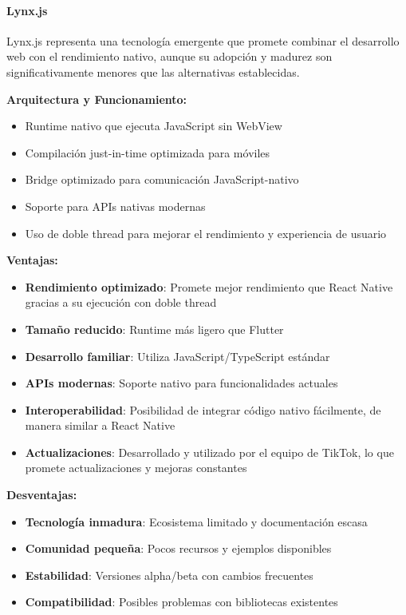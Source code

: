 \paragraph{Lynx.js}

Lynx.js representa una tecnología emergente que promete combinar el desarrollo web con el rendimiento nativo, aunque su adopción y madurez son significativamente menores que las alternativas establecidas.

\textbf{Arquitectura y Funcionamiento:}
\begin{itemize}
    \item Runtime nativo que ejecuta JavaScript sin WebView
    \item Compilación just-in-time optimizada para móviles
    \item Bridge optimizado para comunicación JavaScript-nativo
    \item Soporte para APIs nativas modernas
    \item Uso de doble thread para mejorar el rendimiento y experiencia de usuario
\end{itemize}

\textbf{Ventajas:}
\begin{itemize}
    \item \textbf{Rendimiento optimizado}: Promete mejor rendimiento que React Native gracias a su ejecución con doble thread
    \item \textbf{Tamaño reducido}: Runtime más ligero que Flutter
    \item \textbf{Desarrollo familiar}: Utiliza JavaScript/TypeScript estándar
    \item \textbf{APIs modernas}: Soporte nativo para funcionalidades actuales
    \item \textbf{Interoperabilidad}: Posibilidad de integrar código nativo fácilmente, de manera similar a React Native
    \item \textbf{Actualizaciones}: Desarrollado y utilizado por el equipo de TikTok, lo que promete actualizaciones y mejoras constantes
\end{itemize}

\textbf{Desventajas:}
\begin{itemize}
    \item \textbf{Tecnología inmadura}: Ecosistema limitado y documentación escasa
    \item \textbf{Comunidad pequeña}: Pocos recursos y ejemplos disponibles
    \item \textbf{Estabilidad}: Versiones alpha/beta con cambios frecuentes
    \item \textbf{Compatibilidad}: Posibles problemas con bibliotecas existentes
\end{itemize}

